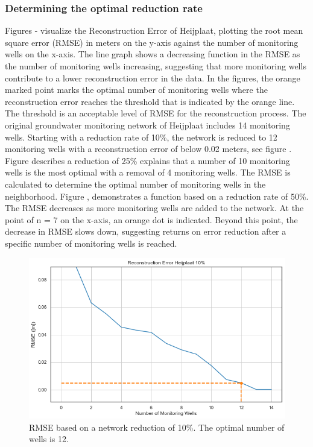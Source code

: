 \subsubsection{Determining the optimal reduction rate}
Figures - visualize the Reconstruction Error of Heijplaat, plotting the root mean square error (RMSE) in meters on the y-axis against the number of monitoring wells on the x-axis. The line graph shows a decreasing function in the RMSE as the number of monitoring wells increasing, suggesting that more monitoring wells contribute to a lower reconstruction error in the data. In the figures, the orange marked point marks the optimal number of monitoring wells where the reconstruction error reaches the threshold that is indicated by the orange line. The threshold is an acceptable level of RMSE for the reconstruction process. The original groundwater monitoring network of Heijplaat includes 14 monitoring wells. 
\newline
Starting with a reduction rate of 10\%, the network is reduced to 12 monitoring wells with a reconstruction error of below 0.02 meters, see figure . Figure  describes a reduction of 25\% explains that a number of 10 monitoring wells is the most optimal with a removal of 4 monitoring wells. The RMSE is calculated to determine the optimal number of monitoring wells in the neighborhood. Figure , demonstrates a function based on a reduction rate of 50\%. The RMSE decreases as more monitoring wells are added to the network. At the point of n = 7 on the x-axis, an orange dot is indicated. Beyond this point, the decrease in RMSE slows down, suggesting returns on error reduction after a specific number of monitoring wells is reached. 


\begin{figure}[htbp]
    \centering
    \includegraphics[width=0.5\linewidth]{frontmatter/Heijplaat-fig/heij10.png}
    \caption{RMSE based on a network reduction of 10\%. The optimal number of wells is 12.}
    \label{heij10}
\end{figure}

